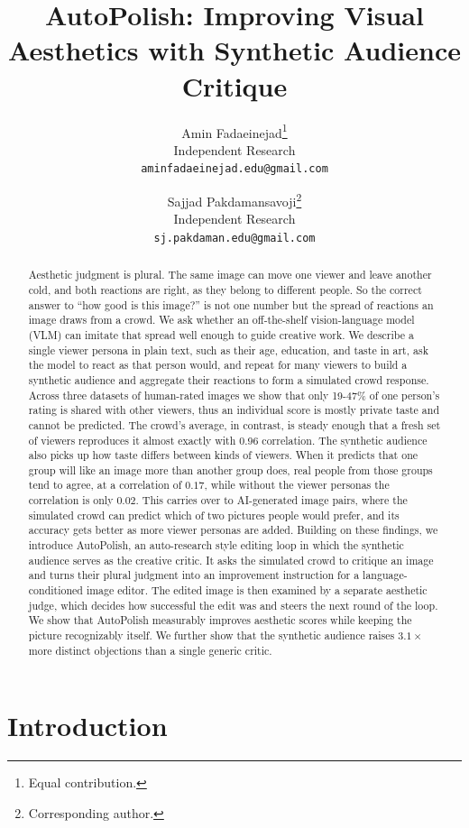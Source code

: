 \documentclass[10pt,twocolumn,letterpaper]{article}
\title{AutoPolish: Improving Visual Aesthetics with Synthetic Audience Critique}
\author{%
Amin Fadaeinejad\thanks{Equal contribution.}\\
Independent Research\\
{\tt\small aminfadaeinejad.edu@gmail.com}
\and
Sajjad Pakdamansavoji\footnotemark[1]\thanks{Corresponding author.}\\
Independent Research\\
{\tt\small sj.pakdaman.edu@gmail.com}
}
\begin{document}
\maketitle


\begin{abstract}
Aesthetic judgment is plural. The same image can move one viewer and leave another cold, and both reactions are right, as they belong to different people. So the correct answer to ``how good is this image?'' is not one number but the spread of reactions an image draws from a crowd. We ask whether an off-the-shelf vision-language model (VLM) can imitate that spread well enough to guide creative work. We describe a single viewer persona in plain text, such as their age, education, and taste in art, ask the model to react as that person would, and repeat for many viewers to build a synthetic audience and aggregate their reactions to form a simulated crowd response. Across three datasets of human-rated images we show that only 19-47\% of one person's rating is shared with other viewers, thus an individual score is mostly private taste and cannot be predicted. The crowd's average, in contrast, is steady enough that a fresh set of viewers reproduces it almost exactly with 0.96 correlation. The synthetic audience also picks up how taste differs between kinds of viewers. When it predicts that one group will like an image more than another group does, real people from those groups tend to agree, at a correlation of $0.17$, while without the viewer personas the correlation is only $0.02$. This carries over to AI-generated image pairs, where the simulated crowd can predict which of two pictures people would prefer, and its accuracy gets better as more viewer personas are added. Building on these findings, we introduce AutoPolish, an auto-research style editing loop in which the synthetic audience serves as the creative critic. It asks the simulated crowd to critique an image and turns their plural judgment into an improvement instruction for a language-conditioned image editor. The edited image is then examined by a separate aesthetic judge, which decides how successful the edit was and steers the next round of the loop. We show that AutoPolish measurably improves aesthetic scores while keeping the picture recognizably itself. We further show that the synthetic audience raises $3.1\times$ more distinct objections than a single generic critic.
\end{abstract}


\section{Introduction}
\end{document}
